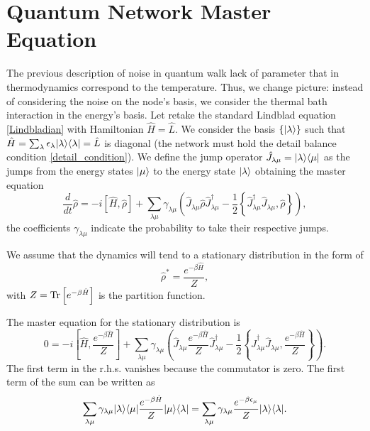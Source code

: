 \section{Quantum Network Master Equation}

The previous description of noise in quantum walk lack of parameter that in thermodynamics correspond to the temperature. 
Thus, we change picture: instead of considering the noise on the node's basis, we consider the thermal bath interaction in the energy's basis.
Let retake the standard Lindblad equation \eqref{Lindbladian} with Hamiltonian $\hat H = \hat L$.
We consider the basis $\{\lvert\lambda\rangle\}$ such that $\hat H = \sum_\lambda \epsilon_\lambda\lvert\lambda\rangle\langle\lambda\rvert = \hat L$ is diagonal (the network must hold the detail balance condition \eqref{detail_condition}).
We define the jump operator $\hat J_{\lambda\mu} = \lvert\lambda\rangle\langle\mu\rvert$ as the jumps from the energy states $\lvert\mu\rangle$ to the energy state $\lvert\lambda\rangle$ obtaining the master equation
\begin{equation}\label{Lindblad_energy_jump}
    \frac{d}{dt}\hat\rho = -i\left[\hat H,\hat\rho\right] + \sum_{\lambda\mu} \gamma_{\lambda\mu} \left(\hat J_{\lambda\mu} \hat\rho \hat J^\dagger_{\lambda\mu} - \frac{1}{2}\left\{ \hat J^\dagger_{\lambda\mu}\hat J_{\lambda\mu}, \hat\rho\right\} \right),
\end{equation}
the coefficients $\gamma_{\lambda\mu}$ indicate the probability to take their respective jumps.

We assume that the dynamics will tend to a stationary distribution in the form of
\begin{equation}\label{pretended_stationary_distribution}
    \hat \rho^* = \frac{e^{-\beta\hat H}}{Z},
\end{equation}
with $Z = \operatorname{Tr}\left[e^{-\beta\hat H}\right]$ is the partition function.

The master equation for the stationary distribution is
\begin{equation}\label{cancel_master_equation}
    0 = -i\left[\hat H, \frac{e^{-\beta\hat H}}{Z}\right] + \sum_{\lambda\mu} \gamma_{\lambda\mu} \left(\hat J_{\lambda\mu}  \frac{e^{-\beta\hat H}}{Z} \hat J^\dagger_{\lambda\mu} - \frac{1}{2}\left\{ \hat J^\dagger_{\lambda\mu}\hat J_{\lambda\mu},  \frac{e^{-\beta\hat H}}{Z}\right\} \right).
\end{equation}
The first term in the r.h.s. vanishes because the commutator is zero. 
The first term of the sum can be written as 
\begin{equation}
        \sum_{\lambda\mu} \gamma_{\lambda\mu} \lvert\lambda\rangle\langle\mu\rvert\frac{e^{-\beta\hat H}}{Z} \lvert\mu\rangle\langle\lambda\rvert = 
        \sum_{\lambda\mu} \gamma_{\lambda\mu} \frac{e^{-\beta \epsilon_\mu}}{Z} \lvert\lambda\rangle\langle\lambda\rvert.
\end{equation}

